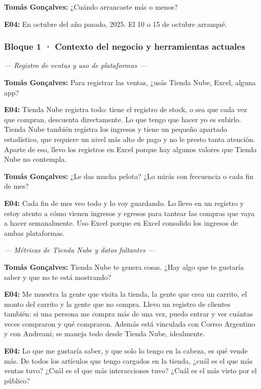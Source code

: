 \noindent\textbf{Tomás Gonçalves:} ¿Cuándo arrancaste más o menos?

\noindent\textbf{E04:} En octubre del año pasado, 2025. El 10 o 15 de octubre arranqué.

\subsubsection*{Bloque 1 · Contexto del negocio y herramientas actuales}

\noindent\textit{--- Registro de ventas y uso de plataformas ---}

\noindent\textbf{Tomás Gonçalves:} Para registrar las ventas, ¿usás Tienda Nube, Excel, alguna app?

\noindent\textbf{E04:} Tienda Nube registra todo: tiene el registro de stock, o sea que cada vez que compran, descuenta directamente. Lo que tengo que hacer yo es subirlo. Tienda Nube también registra los ingresos y tiene un pequeño apartado estadístico, que requiere un nivel más alto de pago y no le presto tanta atención. Aparte de eso, llevo los registros en Excel porque hay algunos valores que Tienda Nube no contempla.

\noindent\textbf{Tomás Gonçalves:} ¿Le das mucha pelota? ¿Lo mirás con frecuencia o cada fin de mes?

\noindent\textbf{E04:} Cada fin de mes veo todo y lo voy guardando. Lo llevo en un registro y estoy atento a cómo vienen ingresos y egresos para tantear las compras que vaya a hacer semanalmente. Uso Excel porque en Excel consolido los ingresos de ambas plataformas.

\noindent\textit{--- Métricas de Tienda Nube y datos faltantes ---}

\noindent\textbf{Tomás Gonçalves:} Tienda Nube te genera cosas. ¿Hay algo que te gustaría saber y que no te está mostrando?

\noindent\textbf{E04:} Me muestra la gente que visita la tienda, la gente que crea un carrito, el monto del carrito y la gente que no compra. Llevo un registro de clientes también: si una persona me compra más de una vez, puedo entrar y ver cuántas veces compraron y qué compraron. Además está vinculada con Correo Argentino y con Andreani; se maneja todo desde Tienda Nube, idealmente.

\noindent\textbf{E04:} Lo que me gustaría saber, y que solo lo tengo en la cabeza, es qué vende más. De todos los artículos que tengo cargados en la tienda, ¿cuál es el que más ventas tuvo? ¿Cuál es el que más interacciones tuvo? ¿Cuál es el más visto por el público?

